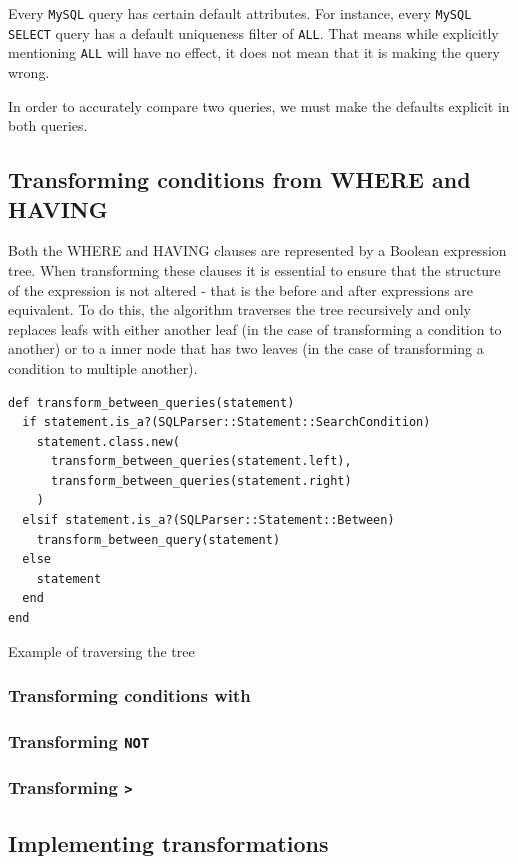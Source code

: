 Every \texttt{MySQL} query has certain default attributes. For instance, every \texttt{MySQL SELECT} query has a default uniqueness filter of \texttt{ALL}. That means while explicitly mentioning \texttt{ALL} will have no effect, it does not mean that it is making the query wrong.

In order to accurately compare two queries, we must make the defaults explicit in both queries.

\subsection{Transforming conditions from WHERE and HAVING}
Both the WHERE and HAVING clauses are represented by a Boolean expression tree. When transforming these clauses it is essential to ensure that the structure of the expression is not altered - that is the before and after expressions are equivalent. To do this, the algorithm traverses the tree recursively and only replaces leafs with either another leaf (in the case of transforming a condition to another) or to a inner node that has two leaves (in the case of transforming a condition to multiple another).

\begin{listing}
\begin{verbatim}
def transform_between_queries(statement)
  if statement.is_a?(SQLParser::Statement::SearchCondition)
    statement.class.new(
      transform_between_queries(statement.left),
      transform_between_queries(statement.right)
    )
  elsif statement.is_a?(SQLParser::Statement::Between)
    transform_between_query(statement)
  else
    statement
  end
end
\end{verbatim}
\caption{Example of traversing the tree}
\end{listing}

\subsubsection{Transforming conditions with }
\subsubsection{Transforming \texttt{NOT}}
\subsubsection{Transforming \texttt{>}}


\subsection{Implementing transformations}

